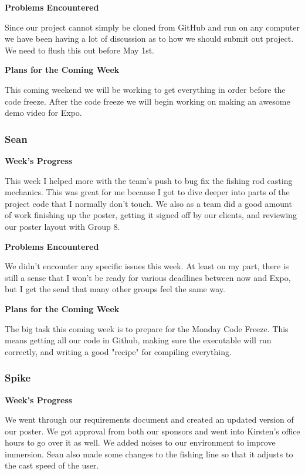\documentclass[10pt,journal,compsoc,onecolumn, draftclsnofoot]{IEEEtran}
\begin{document}
\noindent \textbf{Problems Encountered}

Since our project cannot simply be cloned from GitHub and run on any computer we have been having a lot of discussion as to how we should submit out project. We need to flush this out before May 1st.

\noindent \textbf{Plans for the Coming Week}

This coming weekend we will be working to get everything in order before the code freeze. After the code freeze we will begin working on making an awesome demo video for Expo.

\subsubsection{Sean}
\noindent \textbf{Week's Progress}

This week I helped more with the team's push to bug fix the fishing rod casting mechanics. This was great for me because I got to dive deeper into parts of the project code that I normally don't touch. We also as a team did a good amount of work finishing up the poster, getting it signed off by our clients, and reviewing our poster layout with Group 8.

\noindent \textbf{Problems Encountered}

We didn't encounter any specific issues this week. At least on my part, there is still a sense that I won't be ready for various deadlines between now and Expo, but I get the send that many other groups feel the same way.

\noindent \textbf{Plans for the Coming Week}

The big task this coming week is to prepare for the Monday Code Freeze. This means getting all our code in Github, making sure the executable will run correctly, and writing a good "recipe" for compiling everything.

\subsubsection{Spike}
\noindent \textbf{Week's Progress}

We went through our requirements document and created an updated version of our poster. We got approval from both our sponsors and went into Kirsten's office hours to go over it as well. We added noises to our environment to improve immersion. Sean also made some changes to the fishing line so that it adjusts to the cast speed of the user.
\end{document}
